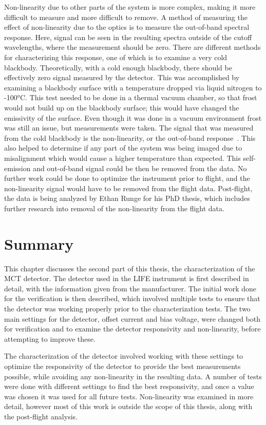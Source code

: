Non-linearity due to other parts of the system is more complex, making it more difficult to measure and more difficult to remove. A method of measuring the effect of non-linearity due to the optics is to measure the out-of-band spectral response. Here, signal can be seen in the resulting spectra outside of the cutoff wavelengths, where the measurement should be zero. There are different methods for characterizing this response, one of which is to examine a very cold blackbody. Theoretically, with a cold enough blackbody, there should be effectively zero signal measured by the detector. This was accomplished by examining a blackbody surface with a temperature dropped via liquid nitrogen to -100°C. This test needed to be done in a thermal vacuum chamber, so that frost would not build up on the blackbody surface; this would have changed the emissivity of the surface. Even though it was done in a vacuum environment frost was still an issue, but measurements were taken. The signal that was measured from the cold blackbody is the non-linearity, or the out-of-band response~\citep{non-linearity_correction}. This also helped to determine if any part of the system was being imaged due to misalignment which would cause a higher temperature than expected. This self-emission and out-of-band signal could be then be removed from the data. No further work could be done to optimize the instrument prior to flight, and the non-linearity signal would have to be removed from the flight data. Post-flight, the data is being analyzed by Ethan Runge for his PhD thesis, which includes further research into removal of the non-linearity from the flight data.

\section{Summary}
This chapter discusses the second part of this thesis, the characterization of the MCT detector. The detector used in the LIFE instrument is first described in detail, with the information given from the manufacturer. The initial work done for the verification is then described, which involved multiple tests to ensure that the detector was working properly prior to the characterization tests. The two main settings for the detector, offset current and bias voltage, were changed both for verification and to examine the detector responsivity and non-linearity, before attempting to improve these.

The characterization of the detector involved working with these settings to optimize the responsivity of the detector to provide the best measurements possible, while avoiding any non-linearity in the resulting data. A number of tests were done with different settings to find the best responsivity, and once a value was chosen it was used for all future tests. Non-linearity was examined in more detail, however most of this work is outside the scope of this thesis, along with the post-flight analysis.